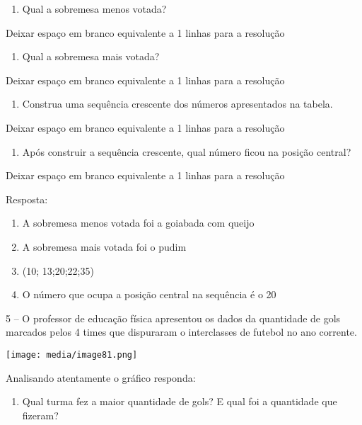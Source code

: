 \begin{enumerate}
\def\labelenumi{\alph{enumi})}
\item
  Qual a sobremesa menos votada?
\end{enumerate}

Deixar espaço em branco equivalente a 1 linhas para a resolução

\begin{enumerate}
\def\labelenumi{\alph{enumi})}
\item
  Qual a sobremesa mais votada?
\end{enumerate}

Deixar espaço em branco equivalente a 1 linhas para a resolução

\begin{enumerate}
\def\labelenumi{\alph{enumi})}
\item
  Construa uma sequência crescente dos números apresentados na tabela.
\end{enumerate}

Deixar espaço em branco equivalente a 1 linhas para a resolução

\begin{enumerate}
\def\labelenumi{\alph{enumi})}
\item
  Após construir a sequência crescente, qual número ficou na posição
  central?
\end{enumerate}

Deixar espaço em branco equivalente a 1 linhas para a resolução

Resposta:

\begin{enumerate}
\def\labelenumi{\alph{enumi})}
\item
  A sobremesa menos votada foi a goiabada com queijo
\item
  A sobremesa mais votada foi o pudim
\item
  (10; 13;20;22;35)
\item
  O número que ocupa a posição central na sequência é o 20
\end{enumerate}

5 -- O professor de educação física apresentou os dados da quantidade de
gols marcados pelos 4 times que dispuraram o interclasses de futebol no
ano corrente.

\texttt{[image: media/image81.png]}

Analisando atentamente o gráfico responda:

\begin{enumerate}
\def\labelenumi{\alph{enumi})}
\item
  Qual turma fez a maior quantidade de gols? E qual foi a quantidade que
  fizeram?
\end{enumerate}

